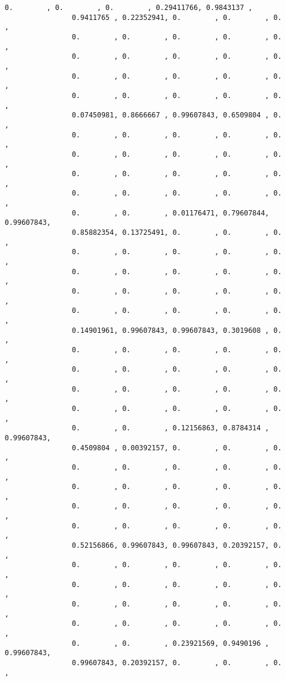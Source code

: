 \documentclass[11pt]{article}
\begin{document}
\begin{Verbatim}[commandchars=\\\{\}]
                0.        , 0.        , 0.        , 0.29411766, 0.9843137 ,
                0.9411765 , 0.22352941, 0.        , 0.        , 0.        ,
                0.        , 0.        , 0.        , 0.        , 0.        ,
                0.        , 0.        , 0.        , 0.        , 0.        ,
                0.        , 0.        , 0.        , 0.        , 0.        ,
                0.        , 0.        , 0.        , 0.        , 0.        ,
                0.07450981, 0.8666667 , 0.99607843, 0.6509804 , 0.        ,
                0.        , 0.        , 0.        , 0.        , 0.        ,
                0.        , 0.        , 0.        , 0.        , 0.        ,
                0.        , 0.        , 0.        , 0.        , 0.        ,
                0.        , 0.        , 0.        , 0.        , 0.        ,
                0.        , 0.        , 0.01176471, 0.79607844, 0.99607843,
                0.85882354, 0.13725491, 0.        , 0.        , 0.        ,
                0.        , 0.        , 0.        , 0.        , 0.        ,
                0.        , 0.        , 0.        , 0.        , 0.        ,
                0.        , 0.        , 0.        , 0.        , 0.        ,
                0.        , 0.        , 0.        , 0.        , 0.        ,
                0.14901961, 0.99607843, 0.99607843, 0.3019608 , 0.        ,
                0.        , 0.        , 0.        , 0.        , 0.        ,
                0.        , 0.        , 0.        , 0.        , 0.        ,
                0.        , 0.        , 0.        , 0.        , 0.        ,
                0.        , 0.        , 0.        , 0.        , 0.        ,
                0.        , 0.        , 0.12156863, 0.8784314 , 0.99607843,
                0.4509804 , 0.00392157, 0.        , 0.        , 0.        ,
                0.        , 0.        , 0.        , 0.        , 0.        ,
                0.        , 0.        , 0.        , 0.        , 0.        ,
                0.        , 0.        , 0.        , 0.        , 0.        ,
                0.        , 0.        , 0.        , 0.        , 0.        ,
                0.52156866, 0.99607843, 0.99607843, 0.20392157, 0.        ,
                0.        , 0.        , 0.        , 0.        , 0.        ,
                0.        , 0.        , 0.        , 0.        , 0.        ,
                0.        , 0.        , 0.        , 0.        , 0.        ,
                0.        , 0.        , 0.        , 0.        , 0.        ,
                0.        , 0.        , 0.23921569, 0.9490196 , 0.99607843,
                0.99607843, 0.20392157, 0.        , 0.        , 0.        ,

\end{Verbatim}
\end{document}
